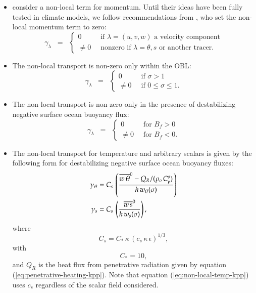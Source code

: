 \begin{itemize}

\item \cite{Smyth_etal2002} consider a non-local term for momentum.
  Until their ideas have been fully tested in climate models, we
  follow recommendations from \citep{LargeKPP}, who set the non-local
  momentum term to zero:
\begin{equation}
 \gamma_{\lambda} \; \; = \; \; 
\left\{
 \begin{array}{ll}
  0 \; \;  &\mbox{if $\lambda = (u,v,w)$ a velocity component}
 \\
  \ne 0 \; \; &\mbox{nonzero if $\lambda = \theta,s$ or another tracer.}
  \end{array}
 \right.
\end{equation}

  \item The non-local transport is non-zero only within the OBL:  
\begin{equation}
 \gamma_{\lambda} \; \; = \; \; 
  \left\{ 
  \begin{array}{ll}
   0 \; \; &\mbox{if $\sigma > 1$}
   \\ 
   \ne 0  \; \; &\mbox{if $0 \le \sigma \le 1$.}
  \end{array}
 \right.
\end{equation}

  \item The non-local transport is non-zero only in the presence of
    destabilizing negative surface ocean buoyancy flux:
\begin{equation}
 \gamma_{\lambda} \; \; = \; \; 
  \left\{ 
  \begin{array}{ll}
   0 \; \; &\mbox{for $B_{f} > 0$}
   \\ 
   \ne 0 \; \; &\mbox{for $B_{f} < 0$.}
  \end{array}
 \right.
\end{equation}


\item The non-local transport for temperature and arbitrary scalars is
  given by the following form for destabilizing negative surface ocean
  buoyancy fluxes:
\begin{align}
 \gamma_{\theta} &= 
   C_{s} \, \left( \frac{ \overline{w \, \theta}^{0} - Q_{R}/(\rho_{o} \, C_{\mbox{\tiny p}}^{o})  }{h \,  w_{\theta}(\sigma)}  
            \right) 
\label{eq:non-local-temp-kpp}
\\
 \gamma_{s} &= 
   C_{s} \, \left( \frac{ \overline{w \, s}^{0} }{h \,  w_{s}(\sigma)}  
            \right), 
\label{eq:non-local-scalar-kpp}
\end{align}
 where 
\begin{equation}
 C_{s} = C_{*} \, \kappa \, (c_{s} \, \kappa \, \epsilon)^{1/3},  
\label{eq:cs-and-cstar-defined}
\end{equation}
with 
\begin{equation}
 C_{*} = 10,
\label{eq:cstar-value-specified}
\end{equation}
and $Q_{R}$ is the heat flux from penetrative radiation given by
equation (\ref{eq:penetrative-heating-kpp}).  Note that equation
(\ref{eq:non-local-temp-kpp}) uses $c_{s}$ regardless of the scalar
field considered.  


\end{itemize}
